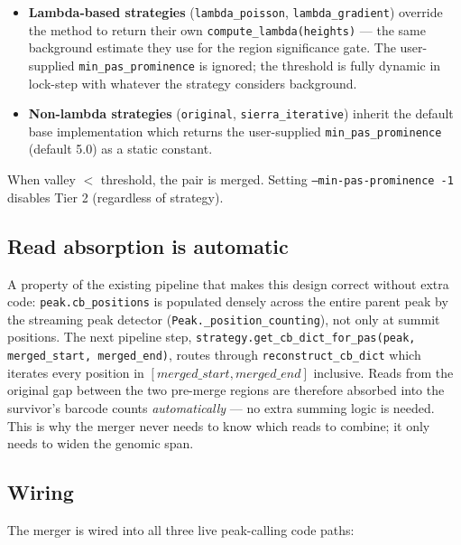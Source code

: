 \documentclass[11pt,a4paper]{article}
\begin{document}
\begin{itemize}
  \item \textbf{Lambda-based strategies} (\texttt{lambda\_poisson},
        \texttt{lambda\_gradient}) override the method to return their own
        \texttt{compute\_lambda(heights)} --- the same background estimate
        they use for the region significance gate.  The user-supplied
        \texttt{min\_pas\_prominence} is ignored; the threshold is fully
        dynamic in lock-step with whatever the strategy considers background.
  \item \textbf{Non-lambda strategies} (\texttt{original},
        \texttt{sierra\_iterative}) inherit the default base implementation
        which returns the user-supplied \texttt{min\_pas\_prominence}
        (default 5.0) as a static constant.
\end{itemize}

When valley $<$ threshold, the pair is merged.  Setting
\texttt{--min-pas-prominence -1} disables Tier 2 (regardless of strategy).

\subsection{Read absorption is automatic}

A property of the existing pipeline that makes this design correct without
extra code: \texttt{peak.cb\_positions} is populated densely across the
entire parent peak by the streaming peak detector (\texttt{Peak.\_position\_counting}),
not only at summit positions.  The next pipeline step,
\texttt{strategy.get\_cb\_dict\_for\_pas(peak, merged\_start, merged\_end)},
routes through \texttt{reconstruct\_cb\_dict} which iterates every position
in $[merged\_start, merged\_end]$ inclusive.  Reads from the original gap
between the two pre-merge regions are therefore absorbed into the survivor's
barcode counts \emph{automatically} --- no extra summing logic is needed.
This is why the merger never needs to know which reads to combine; it only
needs to widen the genomic span.

\subsection{Wiring}

The merger is wired into all three live peak-calling code paths:
\end{document}
